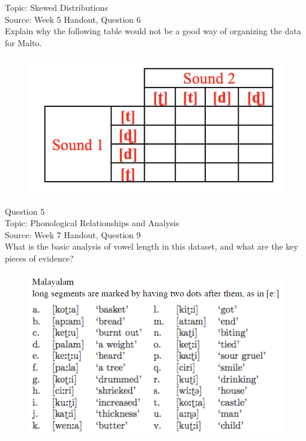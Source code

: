 \documentclass[12pt]{article}
\begin{document}
Topic: Skewed Distributions\\
Source: Week 5 Handout, Question 6\\

Explain why the following table would not be a good way of organizing the data for Malto.\\

\begin{figure}[H]
\includegraphics{../images/Malto_table_bad.png}
\end{figure}

\newpage

{\large Question 5}\\

Topic: Phonological Relationships and Analysis\\
Source: Week 7 Handout, Question 9\\

What is the basic analysis of vowel length in this dataset, and what are the key pieces of evidence?\\

\begin{figure}[H]
\includegraphics{../images/malayalam.png}
\end{figure}
\end{document}
